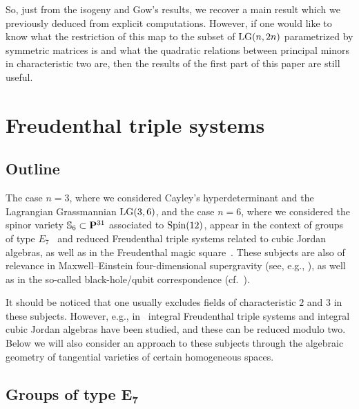 \documentclass[10pt,a4paper]{amsart}
\newcommand{\PP}{{\bf P}}
\newcommand{\bS}{{\mathbb S}}
\numberwithin{equation}{section}
\begin{document}
\begin{Remark}
So, just from the isogeny and Gow's results, we recover a main result which we previously deduced from explicit computations. However, if one would like to know what the restriction of this map to the subset of ${\rm LG}(n,2n)$ parametrized by symmetric matrices is and what the quadratic relations between principal minors in characteristic two are, then the results of the first part of this paper are still useful.
\end{Remark}

\section{Freudenthal triple systems}

\subsection{Outline}
The case $n=3$, where we considered Cayley's hyperdeterminant and the Lagrangian Grassmannian ${\rm LG}(3,6)$, and the case $n=6$, where we considered the spinor variety $\bS_6\subset\PP^{31}$ associated to ${\rm Spin}(12)$, appear in the context of groups of type $E_7$~\cite{Brown} and reduced Freudenthal triple systems related to cubic Jordan algebras, as well as in the Freudenthal magic square~\cite{LM}. These subjects are also of relevance in Maxwell--Einstein four-dimensional supergravity (see, e.g., \cite{BFGM,BDFMR,CFMZ,FGK,FG,FM}), as well as in the so-called black-hole/qubit correspondence (cf.~\cite{BDDER,BDL,D,KL}).

It should be noticed that one usually excludes fields of characteristic $2$ and $3$ in these subjects. However, e.g., in~\cite{BDDR} integral Freudenthal triple systems and integral cubic Jordan algebras have been studied, and these can be reduced modulo two. Below we will also consider an approach to these subjects through the algebraic geometry of tangential varieties of certain homogeneous spaces.

\subsection[Groups of type $E_7$]{Groups of type $\boldsymbol{E_7}$}\label{jor}
\end{document}
